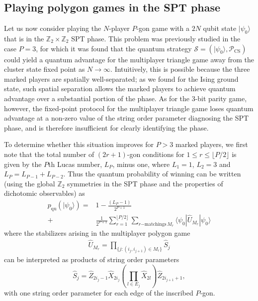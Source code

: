 \documentclass[prb,twocolumn,showpacs,amssymb,superscriptaddress]{revtex4-2}
\begin{document}
\subsection{Playing polygon games in the SPT phase}
Let us now consider playing the $N$-player $P$-gon game with a $2N$ qubit state $|\psi_0\rangle$ that is in the $\mathbb{Z}_2 \times \mathbb{Z}_2$ SPT phase. This problem was previously studied in the case $P=3$, for which it was found that the quantum strategy $\mathcal{S} = (|\psi_0\rangle,\mathcal{P}_{\mathrm{CS}})$ could yield a quantum advantage for the multiplayer triangle game away from the cluster state fixed point as $N\rightarrow \infty$\cite{DanielMiyake}. Intuitively, this is possible because the three marked players are spatially well-separated; as we found for the Ising ground state, such spatial separation allows the marked players to achieve quantum advantage over a substantial portion of the phase. As for the $3$-bit parity game, however, the fixed-point protocol for the multiplayer triangle game loses quantum advantage at a non-zero value of the string order parameter diagnosing the SPT phase, and is therefore insufficient for clearly identifying the phase.

To determine whether this situation improves for $P>3$ marked players, we first note that the total number of $(2r+1)$-gon conditions for $1 \leq r \leq \lfloor P/2 \rfloor$ is given by the $P$th Lucas number, $L_P$, minus one, where $L_1 = 1$, $L_2=3$ and $L_P = L_{P-1}+L_{P-2}$. Thus the quantum probability of winning can be written (using the global $\mathbb{Z}_2$ symmetries in the SPT phase and the properties of dichotomic observables\cite{DanielMiyake}) as
\begin{align}
\nonumber p_{\mathrm{qu}}(|\psi_0\rangle) = &1-\frac{(L_P-1)}{2^{P+1}} \\
+ &\frac{1}{2^{P+1}}\sum_{r=1}^{\lfloor P/2 \rfloor} \sum_{r\mathrm{-matchings \,} M_r} \langle \psi_0| \hat{U}_{M_r} | \psi_0\rangle
\end{align}
where the stabilizers arising in the multiplayer polygon game
\begin{align}
\hat{U}_{M_r} = \prod_{\{j:(i_j,i_{j+1})\in M_r\}} \hat{S}_j
\end{align}
can be interpreted as products of string order parameters\cite{DanielMiyake}
\begin{equation}
\hat{S}_j = \hat{Z}_{2i_j-1}\hat{X}_{2i_j} \left(\prod_{l \in E_j} \hat{X}_{2l}\right)\hat{Z}_{2i_{j+1}+1},
\end{equation}
with one string order parameter for each edge of the inscribed $P$-gon.
\end{document}
